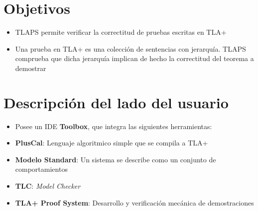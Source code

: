 \documentclass[12pt]{beamer}
\newenvironment{stepitemize}{\begin{itemize}[<+->]}{\end{itemize} }
\begin{document}
\begin{comment}
If 

\begin{stepitemize}
 \item $\varphi$ is an EFD,
 \item $\mathbf{A} \sat \varphi$ and 
 \item $\mathbf{B}$ is a daughter of $\mathbf{A}$
\end{stepitemize}

\pause

Then

\[ \mathbf{B} \sat \varphi \]


\end{frame}

\end{comment}

\section{Objetivos}
\begin{frame}
\begin{stepitemize}
 \item TLAPS permite verificar la correctitud de pruebas escritas en TLA+
 \item Una prueba en TLA+ es una colección de sentencias con jerarquía. TLAPS comprueba que dicha jerarquía implican de hecho la correctitud del teorema a demostrar
\end{stepitemize}
\end{frame}



\section{Descripción del lado del usuario}
\begin{frame}
  \begin{itemize}
    \item Posee un IDE \textbf{Toolbox}, que integra las siguientes herramientas:	
	\item \textbf{PlusCal}: Lenguaje algoritmico simple que se compila a TLA+
	\item \textbf{Modelo Standard}: Un sistema se describe como un conjunto de comportamientos
	\item \textbf{TLC}: \textit{Model Checker}
	\item \textbf{TLA+ Proof System}: Desarrollo y verificación mecánica de demostraciones
  \end{itemize}

\end{frame}
\end{document}
